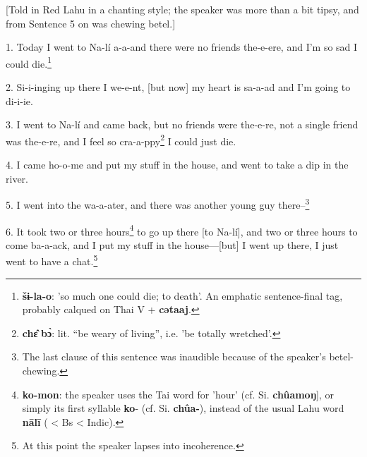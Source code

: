 \setcounter{footnote}{0}

[Told in Red Lahu in a chanting style; the speaker was more than a bit tipsy, and
from Sentence 5 on was chewing betel.]

1. Today I went to Na-lí a-a-and there were no friends the-e-ere, and I'm so sad
I could die.\footnote{\textbf{šɨ-la-o}: 'so much one could die; to death'. An emphatic sentence-final tag, probably calqued on Thai V + \textbf{cətaaj}.}

2. Si-i-inging up there I we-e-nt, [but now] my heart is sa-a-ad and I'm going
to di-i-ie.

3. I went to Na-lí and came back, but no friends were the-e-re, not a single friend
was the-e-re, and I feel so cra-a-ppy\footnote{\textbf{chɛ̂} \textbf{bɔ̀}: lit. ``be weary of living'', i.e. 'be totally wretched'.} I could just die.

4. I came ho-o-me and put my stuff in the house, and went to take a dip in the
river.

5. I went into the wa-a-ater, and there was another young guy there--\footnote{The last clause of this sentence was inaudible because of the speaker's betel-chewing.}

6. It took two or three hours\footnote{\textbf{ko-mon}: the speaker uses the Tai word for 'hour' (cf. Si. \textbf{chûamoŋ}], or simply its first syllable \textbf{ko}- (cf. Si. \textbf{chûa-}), instead of the usual Lahu word \textbf{nālī} ( < Bs < Indic).} to go up there [to Na-lí], and two or three
hours to come ba-a-ack, and I put my stuff in the house---[but] I went up there,
I just went to have a chat.\footnote{At this point the speaker lapses into incoherence.}

